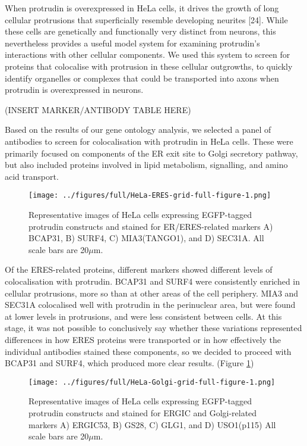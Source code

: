 \documentclass[
  12pt,
  a4paper,
]{book}
\begin{document}
When protrudin is overexpressed in HeLa cells, it drives the growth of long cellular protrusions that superficially resemble developing neurites {[}24{]}. While these cells are genetically and functionally very distinct from neurons, this nevertheless provides a useful model system for examining protrudin's interactions with other cellular components. We used this system to screen for proteins that colocalise with protrusion in these cellular outgrowths, to quickly identify organelles or complexes that could be transported into axons when protrudin is overexpressed in neurons.

(INSERT MARKER/ANTIBODY TABLE HERE)

Based on the results of our gene ontology analysis, we selected a panel of antibodies to screen for colocalisation with protrudin in HeLa cells. These were primarily focused on components of the ER exit site to Golgi secretory pathway, but also included proteins involved in lipid metabolism, signalling, and amino acid transport.

\begin{figure}
\centering
\texttt{[image: ../figures/full/HeLa-ERES-grid-full-figure-1.png]}
\caption{\label{fig:HeLa-ERES-grid-full-figure}Representative images of HeLa cells expressing EGFP-tagged protrudin constructs and stained for ER/ERES-related markers A) BCAP31, B) SURF4, C) MIA3(TANGO1), and D) SEC31A. All scale bars are 20\(\mu\)m.}
\end{figure}

Of the ERES-related proteins, different markers showed different levels of colocalisation with protrudin. BCAP31 and SURF4 were consistently enriched in cellular protrusions, more so than at other areas of the cell periphery. MIA3 and SEC31A colocalised well with protrudin in the perinuclear area, but were found at lower levels in protrusions, and were less consistent between cells. At this stage, it was not possible to conclusively say whether these variations represented differences in how ERES proteins were transported or in how effectively the individual antibodies stained these components, so we decided to proceed with BCAP31 and SURF4, which produced more clear results. (Figure \ref{fig:HeLa-ERES-grid-full-figure})

\begin{figure}
\centering
\texttt{[image: ../figures/full/HeLa-Golgi-grid-full-figure-1.png]}
\caption{\label{fig:HeLa-Golgi-grid-full-figure}Representative images of HeLa cells expressing EGFP-tagged protrudin constructs and stained for ERGIC and Golgi-related markers A) ERGIC53, B) GS28, C) GLG1, and D) USO1(p115) All scale bars are 20\(\mu\)m.}
\end{figure}
\end{document}
